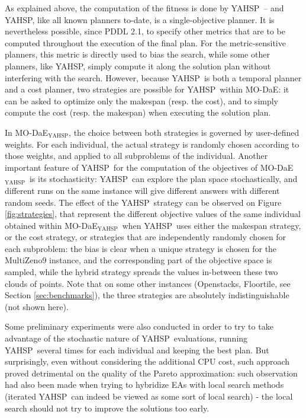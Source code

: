 \documentclass{article}
\def\YAHSP{{\sc YAHSP}}
\def\MODAE{{\sc MO-DaE}}
\newcommand{\MODAEYAHSP}{{\sc MO-DaE$_{\text{YAHSP}}$}}
\def\MULTIZENO{{\sc MultiZeno}}
\def\WMAKESPAN{{W-makespan}}
\def\WCOST{{W-cost}}
\newcommand{\OPENSTACKS}{{\sc Openstacks}}
\newcommand{\FLOORTILE}{{\sc Floortile}}
\begin{document}
As explained above, the computation of the fitness is done by \YAHSP\ -- and \YAHSP, like all known planners to-date, is a single-objective planner. It is nevertheless possible, since PDDL 2.1, to specify other metrics that are to be computed throughout the execution of the final plan. For the metric-sensitive planners, this metric is directly used to bias the search, while some other planners, like \YAHSP, simply compute it along the solution plan without interfering with the search. However, because \YAHSP\ is both a temporal planner and a cost planner, two strategies are possible for \YAHSP\ within \MODAE: it can be asked to optimize only the makespan (resp. the cost), and to simply compute the cost (resp. the makespan) when executing the solution plan. 

In \MODAEYAHSP, the choice between both strategies is governed by user-defined weights.
For each individual, the actual strategy is randomly chosen according to those weights, and applied to all subproblems of the individual. Another important feature of \YAHSP\ for the computation of the objectives of \MODAEYAHSP\ is its stochasticity: \YAHSP\ can explore the plan space stochastically, and different runs on the same instance will give different answers with different random seeds. The effect of the \YAHSP\ strategy %
can be observed on Figure \ref{fig:strategies}, that represent the different objective values of the same individual obtained within \MODAEYAHSP\ when \YAHSP\ uses either the makespan strategy, or the cost strategy, or strategies that are independently randomly chosen for each subproblem: the bias is clear when a unique strategy is chosen for the \MULTIZENO9 instance, and the corresponding part of the objective space is sampled, while the hybrid strategy spreads the values in-between these two clouds of points. Note that on some other instances (\OPENSTACKS, \FLOORTILE, see Section \ref{sec:benchmarks}), the three strategies are absolutely indistinguishable (not shown here).

Some preliminary experiments were also conducted in order to try to take advantage of the stochastic nature of \YAHSP\ evaluations, running \YAHSP\ several times for each individual and keeping the best plan. But surprisingly, even without considering the additional CPU cost, such approach proved detrimental on the quality of the Pareto approximation: such observation had also been made when trying to hybridize EAs with local search methods (iterated \YAHSP\ can indeed be viewed as some sort of local search) - the local search should not try to improve the solutions too early.
\end{document}

